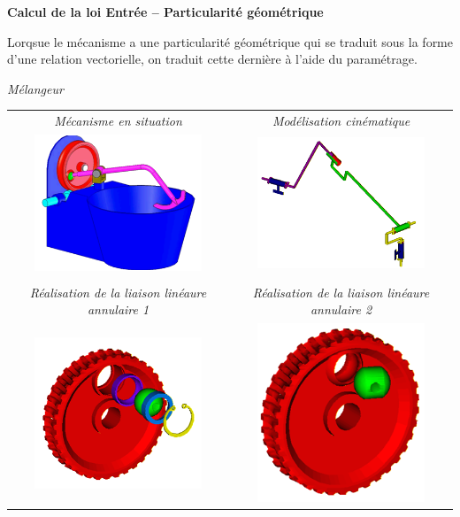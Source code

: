 \documentclass[10pt,oneside]{article}
\begin{document}
\begin{methode}
\textbf{Calcul de la loi Entrée -- Particularité géométrique}

Lorqsue le mécanisme a une particularité géométrique qui se traduit sous la forme d'une relation vectorielle, on traduit cette dernière à l'aide du paramétrage.

\end{methode}

\begin{exemple}
\textit{Mélangeur}
\begin{center}
\begin{tabular}{cc}
\textit{Mécanisme en situation} & \textit{Modélisation cinématique} \\
\includegraphics[width=5cm]{png/melangeur_1} & \includegraphics[width=5cm]{png/melangeur_2} \\
& \\
\textit{Réalisation de la liaison linéaure annulaire 1} & \textit{Réalisation de la liaison linéaure annulaire 2} \\ 
\includegraphics[width=5cm]{png/melangeur_3} & \includegraphics[width=5cm]{png/melangeur_4} \\


\end{tabular}
\end{center}
\end{exemple}
\end{document}
